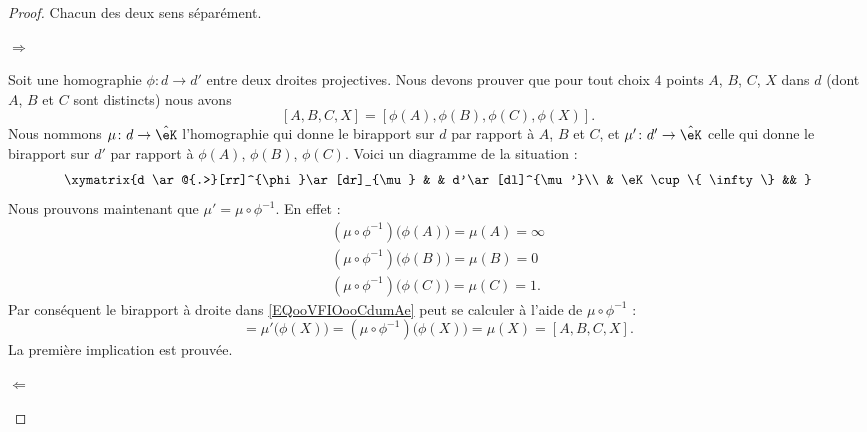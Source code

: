 \begin{proof}
    Chacun des deux sens séparément.
    \begin{subproof}
        \item[\( \Rightarrow\)]

            Soit une homographie \( \phi\colon d\to d'\) entre deux droites projectives. Nous devons prouver que pour tout choix \( 4\) points \( A\), \( B\), \( C\), \( X\) dans \( d\) (dont \( A\), \( B\) et \( C\) sont distincts) nous avons
            \begin{equation}        \label{EQooVFIOooCdumAe}
                [A,B,C,X]=[\phi(A),\phi(B),\phi(C),\phi(X)].
            \end{equation}
            Nous nommons \( \mu\colon d\to \hat\eK\) l'homographie qui donne le birapport sur \( d\) par rapport à \( A\), \( B\) et \( C\), et \( \mu'\colon d'\to \hat\eK\) celle qui donne le birapport sur \( d'\) par rapport à \( \phi(A)\), \( \phi(B)\), \( \phi(C)\). Voici un diagramme de la situation :
            \begin{equation}
            \xymatrix{%
                d \ar@{.>}[rr]^{\phi}\ar[dr]_{\mu}  &    &   d'\ar[dl]^{\mu'}\\
                &  \eK\cup\{ \infty \} &&
               }
            \end{equation}
            Nous prouvons maintenant que \( \mu'=\mu\circ\phi^{-1}\). En effet :
            \begin{subequations}
                \begin{align}
                    (\mu\circ\phi^{-1})\big( \phi(A) \big)=\mu(A)=\infty\\
                    (\mu\circ\phi^{-1})\big( \phi(B) \big)=\mu(B)=0\\
                    (\mu\circ\phi^{-1})\big( \phi(C) \big)=\mu(C)=1.
                \end{align}
            \end{subequations}
            Par conséquent le birapport à droite dans \eqref{EQooVFIOooCdumAe} peut se calculer à l'aide de \( \mu\circ\phi^{-1}\) :
            \begin{equation}
                [\phi(A),\phi(B),\phi(C),\phi(X)]=\mu'\big( \phi(X) \big)=(\mu\circ\phi^{-1})\big( \phi(X) \big)=\mu(X)=[A,B,C,X].
            \end{equation}
            La première implication est prouvée.

        \item[\( \Leftarrow\)]


\end{subproof}
\end{proof}
